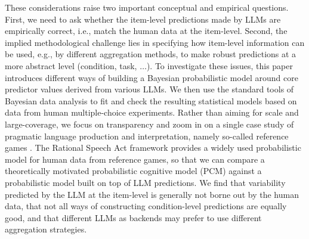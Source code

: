 \documentclass[fleqn]{article}
\begin{document}
These considerations raise two important conceptual and empirical questions.
First, we need to ask whether the item-level predictions made by LLMs are empirically correct, i.e., match the human data at the item-level.
Second, the implied methodological challenge lies in specifying how item-level information can be used, e.g., by different aggregation methods, to make robust predictions at a more abstract level (condition, task, $\dots$).
To investigate these issues, this paper introduces different ways of building a Bayesian probabilistic model around core predictor values derived from various LLMs.
We then use the standard tools of Bayesian data analysis to fit and check the resulting statistical models based on data from human multiple-choice experiments.
Rather than aiming for scale and large-coverage, we focus on transparency and zoom in on a single case study of pragmatic language production and interpretation, namely so-called reference games \citep[e.g.,][]{DeemterSluis2006:Building-a-Sema,DegenFranke2013:Cost-Based-Prag,QingFranke2013:Variations-on-a,Frank2016:Rational-speech,GrafDegen2016:Animal-dog-or-d,SikosVenhuizen2021:Reevaluating-pr}.
The Rational Speech Act framework \citep{FrankGoodman2012:Predicting-Prag} provides a widely used probabilistic model for human data from reference games, so that we can compare a theoretically motivated probabilistic cognitive model (PCM) against a probabilistic model built on top of LLM predictions.
We find that variability predicted by the LLM at the item-level is generally not borne out by the human data, that not all ways of constructing condition-level predictions are equally good, and that different LLMs as backends may prefer to use different aggregation strategies.
\end{document}
